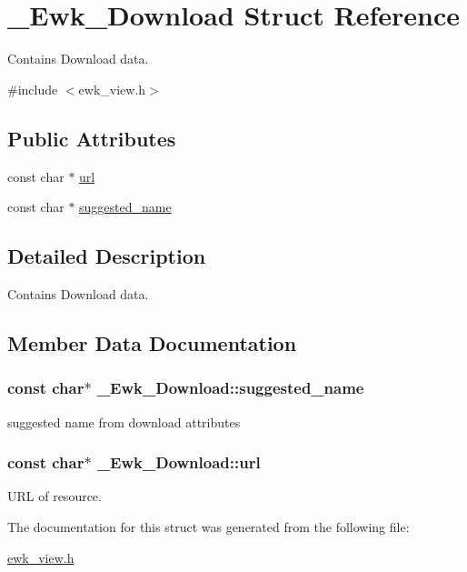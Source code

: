 \hypertarget{struct__Ewk__Download}{\section{\+\_\+\+Ewk\+\_\+\+Download Struct Reference}
\label{struct__Ewk__Download}
}


Contains Download data.  




{\ttfamily \#include $<$ewk\+\_\+view.\+h$>$}

\subsection*{Public Attributes}
\begin{DoxyCompactItemize}
\item 
const char $\ast$ \hyperlink{struct__Ewk__Download_a1ae77efd3463129b3af264e7ef7b2f65}{url}
\item 
const char $\ast$ \hyperlink{struct__Ewk__Download_a1145d774180b15039f489cc1d54740f3}{suggested\+\_\+name}
\end{DoxyCompactItemize}


\subsection{Detailed Description}
Contains Download data. 

\subsection{Member Data Documentation}
\hypertarget{struct__Ewk__Download_a1145d774180b15039f489cc1d54740f3}{
\subsubsection[{suggested\+\_\+name}]{\setlength{\rightskip}{0pt plus 5cm}const char$\ast$ \+\_\+\+Ewk\+\_\+\+Download\+::suggested\+\_\+name}}\label{struct__Ewk__Download_a1145d774180b15039f489cc1d54740f3}
suggested name from download attributes \hypertarget{struct__Ewk__Download_a1ae77efd3463129b3af264e7ef7b2f65}{
\subsubsection[{url}]{\setlength{\rightskip}{0pt plus 5cm}const char$\ast$ \+\_\+\+Ewk\+\_\+\+Download\+::url}}\label{struct__Ewk__Download_a1ae77efd3463129b3af264e7ef7b2f65}
U\+R\+L of resource. 

The documentation for this struct was generated from the following file\+:\begin{DoxyCompactItemize}
\item 
\hyperlink{ewk__view_8h}{ewk\+\_\+view.\+h}\end{DoxyCompactItemize}
